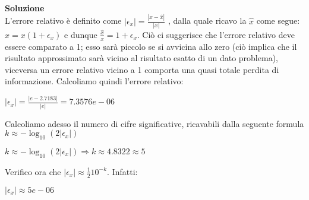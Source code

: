 \large\noindent{}\\
\begin{flushleft}
	\large \textbf{Soluzione}\\[0.5cm]
	L'errore relativo è definito come $|\epsilon_{x}| = \frac{|x-\hat{x}|}{|x|}$ , dalla quale ricavo la $\hat{x}$ come segue:\\
	$\hat{x} = x(1+\epsilon_{x})$ e dunque $\frac{\hat{x}}{x} = 1+\epsilon_{x}$. Ciò ci suggerisce che l'errore relativo deve essere comparato a 1; esso sarà piccolo se si avvicina allo zero (ciò implica che il risultato approssimato sarà vicino al risultato esatto di un dato problema), viceversa un errore relativo vicino a 1 comporta una quasi totale perdita di informazione. Calcoliamo quindi l'errore relativo:
	\begin{center}
		$|\epsilon_{x}| = \frac{|e-2.7183|}{|e|} = 7.3576e - 06$
	\end{center}
	Calcoliamo adesso il numero di cifre significative, ricavabili dalla seguente formula $k \approx -\log_{10}(2|\epsilon_{x}|)$
	\begin{center}
		$k \approx -\log_{10}(2|\epsilon_{x}|) \Longrightarrow k \approx 4.8322 \approx 5$
	\end{center}
	Verifico ora che $|\epsilon_{x}|\approx \frac{1}{2}{10}^{-k} $. Infatti:
	\begin{center}
		$|\epsilon_{x}| \approx 5e-06$
	\end{center}
\end{flushleft}
